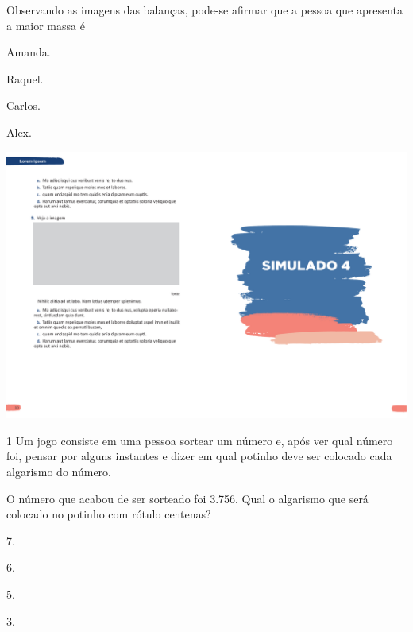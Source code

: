 Observando as imagens das balanças, pode-se afirmar que a pessoa que apresenta a maior massa é

\begin{multicols}{2}
\begin{escolha}
\item
  Amanda.
\item
  Raquel.
\item
  Carlos.
\item
  Alex.
\end{escolha}
\end{multicols}

\pagebreak

\vspace*{-3.4cm}
\hspace*{-3.7cm}\includegraphics[scale=1]{../watermarks/4simulado5ano.pdf}

\pagebreak

\num{1} Um jogo consiste em uma pessoa sortear um número e, após ver qual número foi, pensar por alguns instantes e dizer em qual potinho deve ser colocado cada algarismo do número.


O número que acabou de ser sorteado foi 3.756. Qual o algarismo que será colocado no potinho com rótulo centenas?

\begin{escolha}
\item
  7.
\item
  6.
\item
  5.
\item
  3.
\end{escolha}

